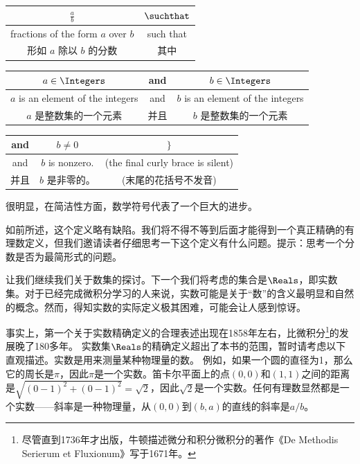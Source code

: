 \begin{tabular}{c|c}
  \rule[-10pt]{0pt}{22pt} $\displaystyle \frac{a}{b}$       & $\suchthat$ \\ \hline
  \rule[-6pt]{0pt}{22pt} fractions of the form $a$ over $b$ & such that   \\
  \rule[-6pt]{0pt}{22pt} 形如 $a$ 除以 $b$ 的分数           & 其中        \\
\end{tabular}

\vspace{.2in}

\begin{tabular}{c|c|c}
  \rule[-10pt]{0pt}{22pt} $a \in \Integers$                & and  & $b \in \Integers$      \\ \hline
  \rule[-6pt]{0pt}{22pt} $a$ is an element of the integers & and  & $b$ is an
  element of the integers                                                                  \\
  \rule[-6pt]{0pt}{22pt} $a$ 是整数集的一个元素            & 并且 & $b$ 是整数集的一个元素 \\
\end{tabular}

\vspace{.2in}

\begin{tabular}{c|c|c}
  \rule[-10pt]{0pt}{22pt} and & $b \neq 0$      & $\}$                   \\ \hline
  \rule[-6pt]{0pt}{22pt} and  & $b$ is nonzero. & (the final curly brace
  is silent)                                                             \\
  \rule[-6pt]{0pt}{22pt} 并且 & $b$ 是非零的。  & (末尾的花括号不发音)   \\
\end{tabular}

\vspace{.2in}

很明显，在简洁性方面，数学符号代表了一个巨大的进步。

如前所述，这个定义略有缺陷。我们将不得不等到后面才能得到一个真正精确的有理数定义，但我们邀请读者仔细思考一下这个定义有什么问题。提示：思考一个分数是否为最简形式的问题。

让我们继续我们关于数集的探讨。下一个我们将考虑的集合是$\Reals$，即实数集。对于已经完成微积分学习的人来说，实数可能是关于“数”的含义最明显和自然的概念。然而，得知实数的实际定义极其困难，可能会让人感到惊讶。

事实上，第一个关于实数精确定义的合理表述出现在1858年左右，比微积分\footnote{尽管直到1736年才出版，牛顿描述微分和积分微积分的著作《De Methodis Serierum et Fluxionum》写于1671年。}的发展晚了180多年。
实数集$\Reals$的精确定义超出了本书的范围，暂时请考虑以下直观描述。实数是用来测量某种物理量的数。
例如，如果一个圆的直径为1，那么它的周长是$\pi$，因此$\pi$是一个实数。笛卡尔平面上的点$(0,0)$和$(1,1)$之间的距离是$\sqrt{ (0-1)^2 + (0-1)^2} = \sqrt{2}$，因此$\sqrt{2}$是一个实数。任何有理数显然都是一个实数——斜率是一种物理量，从$(0,0)$到$(b,a)$的直线的斜率是$a/b$。


